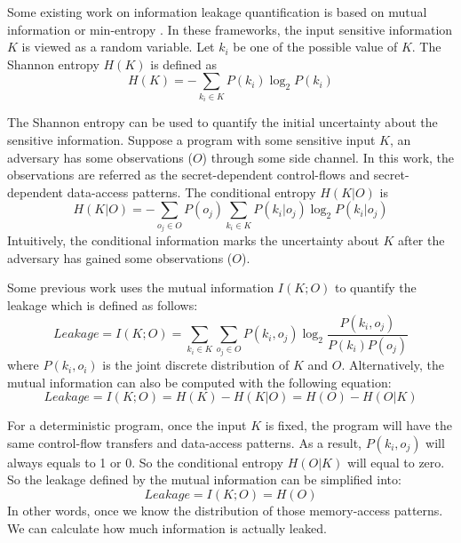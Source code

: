 Some existing work on information leakage quantification is based on mutual information or 
min-entropy \cite{10.1007/978-3-642-00596-1_21}.
In these frameworks, the input sensitive
information $K$ is viewed as a random variable. Let $k_i$ be one of the possible
value of $K$. The Shannon entropy $H(K)$ is defined as
\begin{displaymath}
    H(K) = - \sum_{k_i {\in} K}P(k_i)\log_2P(k_i)
\end{displaymath}

The Shannon entropy can be used to quantify the initial uncertainty about the sensitive
information. Suppose a program with some
sensitive input $K$, an adversary has some observations ($O$) through some side channel.
In this work, the observations are referred as the secret-dependent control-flows and
secret-dependent data-access patterns.  The conditional entropy $H(K|O)$ is
\begin{displaymath}
    H(K|O) = - \sum_{o_j {\in} O} {P(o_j) \sum_{k_i {\in} K}{P(k_i|o_j)\log_2P(k_i|o_j)}}
\end{displaymath}
Intuitively, the conditional information marks the uncertainty about $K$ after the adversary
has gained some observations ($O$). 

Some previous work uses the mutual information $I(K; O)$ to quantify the leakage which is defined 
as follows:
\begin{displaymath}
    \mathit{Leakage} = I(K;O) = \sum_{k_i {\in} K}{\sum_{o_j {\in} O}{P(k_i, o_j)\log_2\frac{P(k_i, o_j)}{P(k_i)P(o_j)}}}
\end{displaymath}
where $P(k_i, o_i)$ is the joint discrete distribution of $K$ and $O$.
Alternatively, the mutual information can also be computed with the following equation:
\begin{displaymath}
    \mathit{Leakage} = I(K;O) = H(K) - H(K|O) = H(O) - H(O|K)
\end{displaymath}

For a deterministic program, once the input $K$ is fixed, the program will have the same
control-flow transfers and data-access patterns. As a result, $P(k_i, o_j)$ will always
equals to 1 or 0. So the conditional entropy $H(O|K)$ will equal to zero. So the leakage defined
by the mutual information can be simplified into:
\begin{displaymath}
\label{mutual:information}
    \mathit{Leakage} = I(K;O) = H(O)
\end{displaymath}
In other words, once we know the distribution of those memory-access patterns. We can 
calculate how much information is actually leaked.

